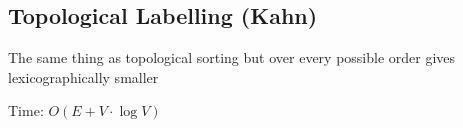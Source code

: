 \subsection{Topological Labelling (Kahn)}

The same thing as topological sorting but over every possible order gives lexicographically smaller

Time: $O(E + V \cdot \log{V})$
